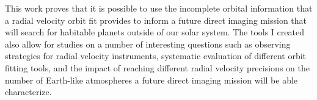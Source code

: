 This work proves that it is possible to use the incomplete orbital information
that a radial velocity orbit fit provides to inform a future direct imaging
mission that will search for habitable planets outside of our solar system. The
tools I created also allow for studies on a number of interesting questions
such as observing strategies for radial velocity instruments, systematic
evaluation of different orbit fitting tools, and the impact of reaching
different radial velocity precisions on the number of Earth-like atmospheres a
future direct imaging mission will be able characterize.
